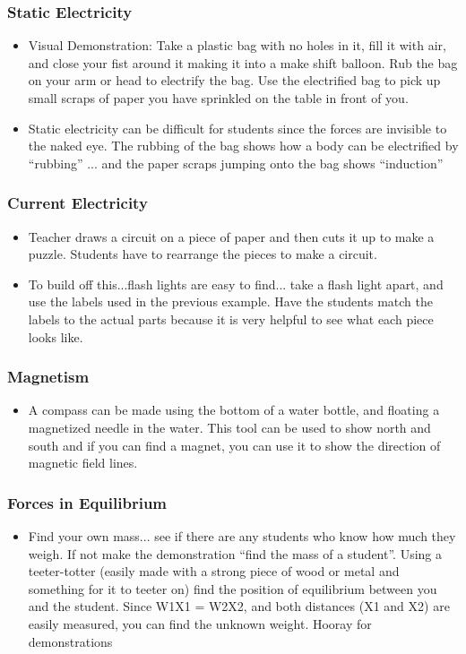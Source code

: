 \subsubsection{Static Electricity}
\begin{itemize}
\item	Visual Demonstration: Take a plastic bag with no holes in it, fill it with air, and close your fist around it making it into a make shift balloon. Rub the bag on your arm or head to electrify the bag.  Use the electrified bag to pick up small scraps of paper you have sprinkled on the table in front of you. 
\item	Static electricity can be difficult for students since the forces are invisible to the naked eye. The rubbing of the bag shows how a body can be electrified by ``rubbing'' ... and the paper scraps jumping onto the bag shows ``induction''
\end{itemize}

\subsubsection{Current Electricity}
\begin{itemize}
\item	Teacher draws a circuit on a piece of paper and then cuts it up to make a puzzle.  Students have to rearrange the pieces to make a circuit.
\item	To build off this...flash lights are easy to find... take a flash light apart, and use the labels used in the previous example. Have the students match the labels to the actual parts because it is very helpful to see what each piece looks like.
\end{itemize}

\subsubsection{Magnetism}
\begin{itemize}
\item	A compass can be made using the bottom of a water bottle, and floating a magnetized needle in the water. This tool can be used to show north and south and if you can find a magnet, you can use it to show the direction of magnetic field lines. 
\end{itemize}

\subsubsection{Forces in Equilibrium}
\begin{itemize}
\item	Find your own mass... see if there are any students who know how much they weigh. If not make the demonstration ``find the mass of a student''. Using a teeter-totter (easily made with a strong piece of wood or metal and something for it to teeter on) find the position of equilibrium between you and the student.  Since W1X1 = W2X2, and both distances (X1 and X2) are easily measured, you can find the unknown weight. Hooray for demonstrations
\end{itemize}

